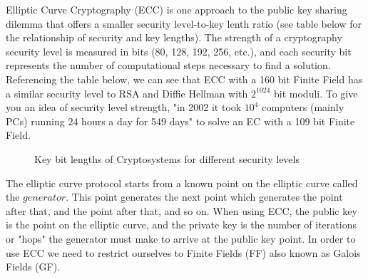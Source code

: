 Elliptic Curve Cryptography (ECC) is one approach to the public key sharing dilemma that offers a smaller security level-to-key lenth ratio (see table below for the relationship  of security and key lengths).  The strength of a cryptography security level is measured in bits (80, 128, 192, 256, etc.), and each security bit represents the number of computational steps necessary to find a solution.  Referencing the table below, we can see that ECC with a 160 bit Finite Field has a similar security level to RSA and Diffie Hellman with $2^{1024}$ bit moduli. To give you an idea of security level strength, "in 2002 it took $10^4$ computers (mainly PCs) running 24 hours a day for 549 days" to solve an EC with a 109 bit Finite Field. 
\begin{figure} [H]
	  \caption{\label{fig:DH:DHKE_9} Key bit lengths of Cryptosystems for different security levels }
\end{figure}
The elliptic curve protocol starts from a known point on the elliptic curve called the $generator$.  This point generates the next point which generates the point after that, and the point after that, and so on.  When using ECC, the public key is the point on the elliptic curve, and the private key is the number of iterations or "hops" the generator must make to arrive at the public key point.  In order to use ECC we need to restrict ourselves to Finite Fields (FF) also known as Galois Fields (GF).

